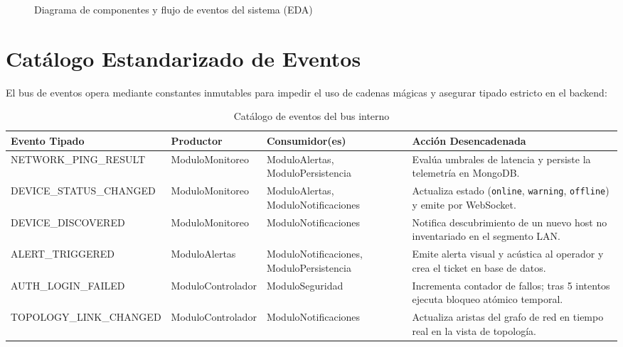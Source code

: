 \documentclass[12pt,a4paper]{report}
\begin{document}
\begin{landscape}
\begin{figure}[htbp]
\caption{Diagrama de componentes y flujo de eventos del sistema (EDA)}\label{fig:diagrama_eventos}
\end{figure}
\end{landscape}

\section{Catálogo Estandarizado de Eventos}
El bus de eventos opera mediante constantes inmutables para impedir el uso de cadenas mágicas y asegurar tipado estricto en el backend:

\begin{table}[htbp]
\centering
\caption{Catálogo de eventos del bus interno}\label{tab:catalogo_eventos}
\small
\begin{tabularx}{\textwidth}{>{\raggedright\arraybackslash\ttfamily\footnotesize}p{3.8cm} >{\raggedright\arraybackslash\small}p{2.9cm} >{\raggedright\arraybackslash\small}p{3.4cm} >{\raggedright\arraybackslash\small}X}
\toprule
\textbf{\textnormal{\textsf{\textbf{Evento Tipado}}}} & \textbf{\textnormal{\textsf{\textbf{Productor}}}} & \textbf{\textnormal{\textsf{\textbf{Consumidor(es)}}}} & \textbf{\textnormal{\textsf{\textbf{Acción Desencadenada}}}} \\
\midrule
NETWORK\_PING\_RESULT & ModuloMonitoreo & ModuloAlertas, ModuloPersistencia & Evalúa umbrales de latencia y persiste la telemetría en MongoDB. \\
\midrule
DEVICE\_STATUS\_CHANGED & ModuloMonitoreo & ModuloAlertas, ModuloNotificaciones & Actualiza estado (\texttt{online}, \texttt{warning}, \texttt{offline}) y emite por WebSocket. \\
\midrule
DEVICE\_DISCOVERED & ModuloMonitoreo & ModuloNotificaciones & Notifica descubrimiento de un nuevo host no inventariado en el segmento LAN. \\
\midrule
ALERT\_TRIGGERED & ModuloAlertas & ModuloNotificaciones, ModuloPersistencia & Emite alerta visual y acústica al operador y crea el ticket en base de datos. \\
\midrule
AUTH\_LOGIN\_FAILED & ModuloControlador & ModuloSeguridad & Incrementa contador de fallos; tras 5 intentos ejecuta bloqueo atómico temporal. \\
\midrule
TOPOLOGY\_LINK\_CHANGED & ModuloControlador & ModuloNotificaciones & Actualiza aristas del grafo de red en tiempo real en la vista de topología. \\
\bottomrule
\end{tabularx}
\end{table}
\end{document}
